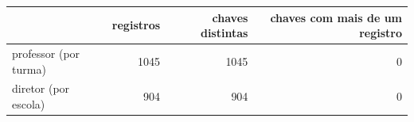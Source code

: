 \begin{tabular}{lrrr}
\toprule
 & registros & chaves distintas & chaves com mais de um registro \\
\midrule
professor (por turma) & 1045 & 1045 & 0 \\
diretor (por escola) & 904 & 904 & 0 \\
\bottomrule
\end{tabular}
